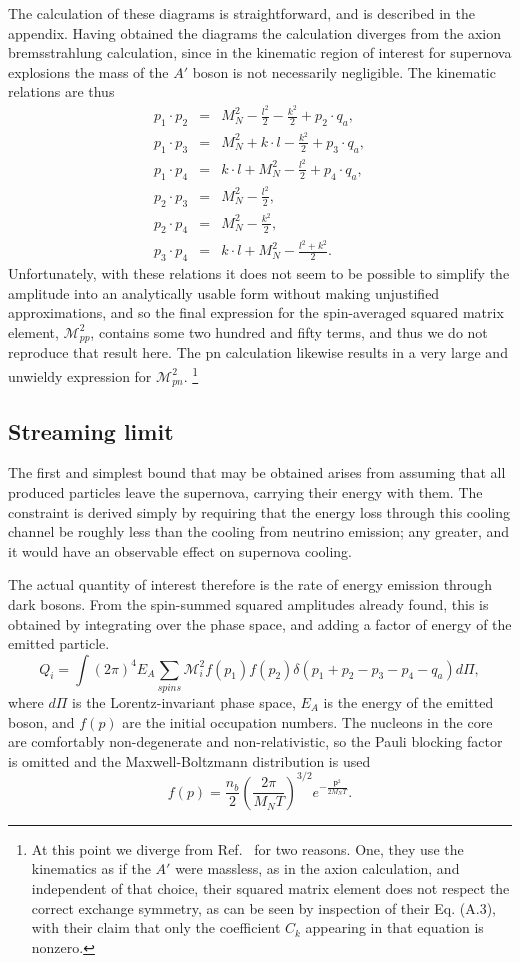\documentclass[nofootinbib,prd,superscriptaddress,twocolumn]{revtex4}
\newcommand{\beq}{\begin{equation}}
\newcommand{\eeq}{\end{equation}}
\newcommand{\bea}{\begin{eqnarray}}
\newcommand{\eea}{\end{eqnarray}}
\begin{document}
The calculation of these diagrams is straightforward, and is described in the appendix. Having obtained the diagrams the calculation diverges from the axion bremsstrahlung calculation, since in the kinematic region of interest for supernova explosions the mass of the $A'$ boson is not necessarily negligible. The kinematic relations are thus \bea 
p_1 \cdot p_2 &=& M_N^2 - \frac{l^2}{2} - \frac{k^2}{2} + p_2 \cdot q_a,\\
p_1 \cdot p_3 &=& M_N^2 + k \cdot l - \frac{k^2}{2} + p_3 \cdot q_a,\\  
p_1 \cdot p_4 &=& k \cdot l + M_N^2 - \frac{l^2}{2} + p_4 \cdot q_a, \\
p_2 \cdot p_3 &=& M_N^2 - \frac{l^2}{2}, \\ 
p_2 \cdot p_4 &=& M_N^2 - \frac{k^2}{2},\\
p_3 \cdot p_4 &=& k \cdot l + M_N^2 - \frac{l^2 + k^2}{2}.
\eea
Unfortunately, with these relations it does not seem to be possible to simplify the amplitude into an analytically usable form without making unjustified approximations, and so the final expression for the spin-averaged squared matrix element, $ \mathcal{M}^2_{pp}$, contains some two hundred and fifty terms, and thus we do not reproduce that result here. The pn calculation likewise results in a very large and unwieldy expression for $ \mathcal{M}^2_{pn}$. \footnote{At this point we diverge from Ref.~\cite{dent_etal12} for two reasons.  One, they use the kinematics as if the $A'$ were massless, as in the axion calculation, and independent of that choice, their squared matrix element does not respect the correct exchange symmetry, as can be seen by inspection of their Eq. (A.3), with their claim that only the coefficient $C_k$ appearing in that equation is nonzero.}


\subsection{Streaming limit}
The first and simplest bound that may be obtained arises from assuming that all produced particles leave the supernova, carrying their energy with them. The constraint is derived simply by requiring that the energy loss through this cooling channel be roughly less than the cooling from neutrino emission; any greater, and it would have an observable effect on supernova cooling.

The actual quantity of interest therefore is the rate of energy emission through dark bosons. From the spin-summed squared amplitudes already found, this is obtained by integrating over the phase space, and adding a factor of energy of the emitted particle.
\beq
Q_i = \int (2\pi)^4 E_A \sum_{spins} \mathcal{M}^2_i f(p_1) f(p_2)\delta(p_1+p_2-p_3-p_4-q_a) d\Pi,
\eeq
where $d\Pi$ is the Lorentz-invariant phase space, $ E_A $ is the energy of the emitted boson, and $ f(p) $ are the initial occupation numbers. The nucleons in the core are comfortably non-degenerate and non-relativistic, so  the Pauli blocking factor is omitted and the Maxwell-Boltzmann distribution is used  
\beq
f(p) =  \frac{n_b}{2} (\frac{2 \pi}{M_N T})^{3/2} e^{-\frac{\textbf{p}^2} {2 M_N T}}.
\eeq
	
\end{document}
